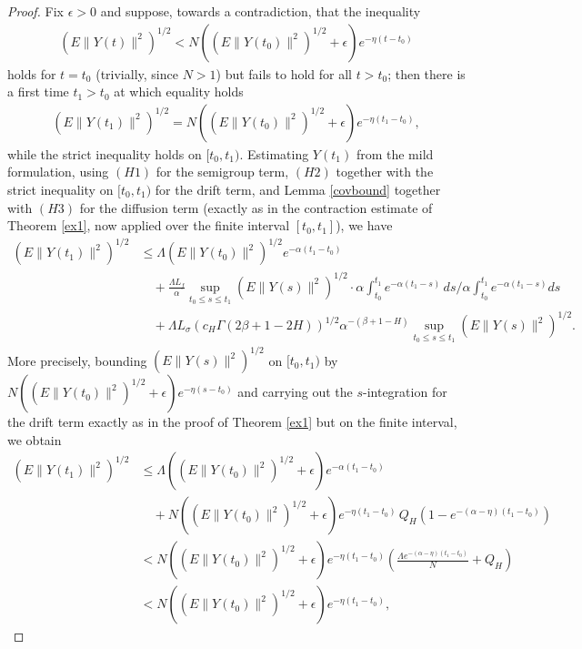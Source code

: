 \documentclass[11pt]{amsart}
\begin{document}
\begin{proof}
Fix $\epsilon>0$ and suppose, towards a contradiction, that the inequality
\begin{align*}
\left(E\|Y(t)\|^2\right)^{1/2}<N\left(\left(E\|Y(t_0)\|^2\right)^{1/2}+\epsilon\right)e^{-\eta(t-t_0)}
\end{align*}
holds for $t=t_0$ (trivially, since $N>1$) but fails to hold for all $t>t_0$; then there is a first time $t_1>t_0$ at which equality holds
\begin{align*}
\left(E\|Y(t_1)\|^2\right)^{1/2}=N\left(\left(E\|Y(t_0)\|^2\right)^{1/2}+\epsilon\right)e^{-\eta(t_1-t_0)},
\end{align*}
while the strict inequality holds on $[t_0,t_1)$. Estimating $Y(t_1)$ from the mild formulation, using $(H1)$ for the semigroup term, $(H2)$ together with the strict inequality on $[t_0,t_1)$ for the drift term, and Lemma \ref{covbound} together with $(H3)$ for the diffusion term (exactly as in the contraction estimate of Theorem \ref{ex1}, now applied over the finite interval $[t_0,t_1]$), we have
\begin{align*}
\left(E\|Y(t_1)\|^2\right)^{1/2}
&\le\Lambda\left(E\|Y(t_0)\|^2\right)^{1/2}e^{-\alpha(t_1-t_0)}\\
&\quad+\frac{\Lambda L_f}\alpha\sup_{t_0\le s\le t_1}\left(E\|Y(s)\|^2\right)^{1/2}\cdot\alpha\int_{t_0}^{t_1}e^{-\alpha(t_1-s)}\,ds\Big/\alpha\int_{t_0}^{t_1}e^{-\alpha(t_1-s)}ds\\
&\quad+\Lambda L_\sigma\left(c_H\Gamma(2\beta+1-2H)\right)^{1/2}\alpha^{-(\beta+1-H)}\sup_{t_0\le s\le t_1}\left(E\|Y(s)\|^2\right)^{1/2}.
\end{align*}
More precisely, bounding $\left(E\|Y(s)\|^2\right)^{1/2}$ on $[t_0,t_1)$ by $N\left(\left(E\|Y(t_0)\|^2\right)^{1/2}+\epsilon\right)e^{-\eta(s-t_0)}$ and carrying out the $s$-integration for the drift term exactly as in the proof of Theorem \ref{ex1} but on the finite interval, we obtain
\begin{align*}
\left(E\|Y(t_1)\|^2\right)^{1/2}
&\le\Lambda\left(\left(E\|Y(t_0)\|^2\right)^{1/2}+\epsilon\right)e^{-\alpha(t_1-t_0)}\\
&\quad+N\left(\left(E\|Y(t_0)\|^2\right)^{1/2}+\epsilon\right)e^{-\eta(t_1-t_0)}\,Q_H\left(1-e^{-(\alpha-\eta)(t_1-t_0)}\right)\\
&<N\left(\left(E\|Y(t_0)\|^2\right)^{1/2}+\epsilon\right)e^{-\eta(t_1-t_0)}\left(\frac{\Lambda e^{-(\alpha-\eta)(t_1-t_0)}}{N}+Q_H\right)\\
&<N\left(\left(E\|Y(t_0)\|^2\right)^{1/2}+\epsilon\right)e^{-\eta(t_1-t_0)},
\end{align*}

\end{proof}
\end{document}
